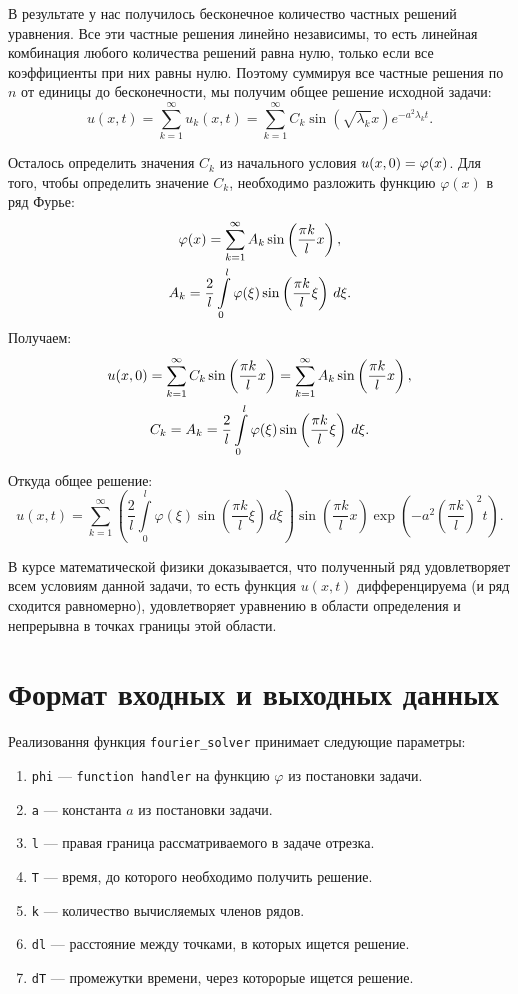 \documentclass[11pt]{article}
\newcommand*{\hm}[1]{#1\nobreak\discretionary{}{\hbox{$\mathsurround=0pt #1$}}{}}
\begin{document}
В результате у нас получилось бесконечное количество частных решений уравнения. Все эти частные решения линейно независимы, то есть линейная комбинация любого количества решений равна нулю, только если все коэффициенты при них равны нулю. Поэтому суммируя все частные решения по $n$ от единицы до бесконечности, мы получим общее решение исходной задачи:
$$
u(x, t) = \sum\limits_{k=1}^\infty u_k(x, t) = \sum\limits_{k=1}^\infty C_k \sin\left( \sqrt{\lambda_k} x \right) e^{-a^2 \lambda_k t}.
$$

Осталось определить значения $C_k$ из начального условия $u(x,0) \hm= \varphi(x)$.
Для того, чтобы определить значение $C_k$, необходимо разложить функцию $\varphi(x)$ в ряд Фурье:
\begin{gather}
\varphi(x) = \sum\limits_{k=1}^\infty A_k\sin\left(\dfrac{\pi k}{l}x\right), \notag \\ 
A_k = \frac{2}{l} \int\limits_0^l \varphi(\xi) \sin\left(\dfrac{\pi k}{l} \xi \right)\, d\xi. \notag
\end{gather}
Получаем:
\begin{gather}
u(x, 0) = \sum\limits_{k=1}^\infty C_k\sin\left( \dfrac{\pi k}{l} x \right) = \sum\limits_{k=1}^\infty A_k\sin\left(\dfrac{\pi k}{l} x\right), \notag \\
C_k = A_k = \frac{2}{l} \int\limits_0^l \varphi(\xi) \sin\left(\dfrac{\pi k}{l}\xi\right)\, d\xi. \notag
\end{gather}

Откуда общее решение:
$$
u(x, t) = \sum\limits_{k=1}^\infty \left(\dfrac{2}{l} \int\limits_0^l \varphi(\xi) \sin\left(\dfrac{\pi k}{l}\xi\right)\, d\xi\right) \sin\left(\dfrac{\pi k}{l}x\right)\exp\left(-a^2\left(\dfrac{\pi k}{l}\right)^2 t\right).
$$

В курсе математической физики доказывается, что полученный ряд удовлетворяет всем условиям данной задачи, то есть функция $u(x, t)$ дифференцируема (и ряд сходится равномерно), удовлетворяет уравнению в области определения и непрерывна в точках границы этой области.

\section{Формат входных и выходных данных}
Реализовання функция \texttt{fourier\_solver} принимает следующие параметры:
\begin{enumerate}
\item
\texttt{phi} --- \texttt{function handler} на функцию $\varphi$ из постановки задачи.
\item
\texttt{a} --- константа $a$ из постановки задачи.
\item
\texttt{l} --- правая граница рассматриваемого в задаче отрезка.
\item
\texttt{T} --- время, до которого необходимо получить решение.
\item
\texttt{k} --- количество вычисляемых членов рядов.
\item
\texttt{dl} --- расстояние между точками, в которых ищется решение.
\item
\texttt{dT} --- промежутки времени, через которорые ищется решение.
\end{enumerate}
\end{document}
